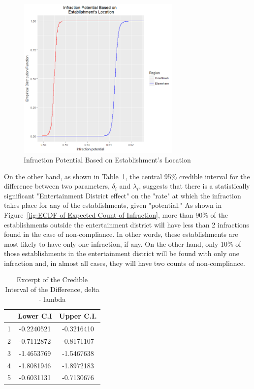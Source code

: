 \documentclass[twoside,onecolumn]{article}
\begin{document}
\begin{figure}[H]
\centering
\includegraphics[height=8cm]{Infraction_Potential}
\caption{Infraction Potential Based on Establishment's Location}
\label{fig:Infraction_Potential_Based_on_Location}
\end{figure}

On the other hand, as shown in Table~\ref{table:delta_lambda_ci}, the central 95\% credible interval for the difference between two parameters, $\delta_i$ and $\lambda_i$, suggests that there is a statistically significant "Entertainment District effect" on the "rate" at which the infraction takes place for any of the establishments, given "potential." As shown in Figure~\ref{fig:ECDF of Expected Count of Infraction}, more than 90\% of the establishments outside the entertainment district will have less than 2 infractions found in the case of non-compliance. In other words, these establishments are most likely to have only one infraction, if any. On the other hand, only 10\% of those establishments in the entertainment district will be found with only one infraction and, in almost all cases, they will have two counts of non-compliance.

\begin{table}[ht]
\caption{Excerpt of the Credible Interval of the Difference, delta - lambda} %
\centering %
\begin{tabular}{c c c} %
\hline\hline %
 & Lower C.I & Upper C.I. \\ [1ex] %
\hline %
1 & -0.2240521 & -0.3216410 \\ %
2 & -0.7112872 & -0.8171107 \\ 
3 & -1.4653769 & -1.5467638 \\
4 & -1.8081946 & -1.8972183 \\
5 & -0.6031131 & -0.7130676 \\ [1ex] %
\hline %
\end{tabular}
\label{table:delta_lambda_ci} %
\end{table}
\end{document}
